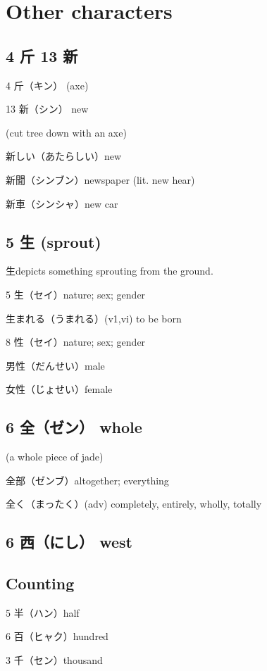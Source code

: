 \chapter{Other characters}

\section{4 斤 13 新}

4 斤（キン） (axe)

13 新（シン） new

(cut tree down with an axe)

新しい（あたらしい）new

新聞（シンブン）newspaper (lit. new hear)

新車（シンシャ）new car

\section{5 生 (sprout)}

生depicts something sprouting from the ground.

5 生（セイ）nature; sex; gender

生まれる（うまれる）(v1,vi) to be born

8 性（セイ）nature; sex; gender

男性（だんせい）male

女性（じょせい）female

\section{6 全（ゼン） whole}

(a whole piece of jade)

全部（ゼンブ）altogether; everything

全く（まったく）(adv) completely, entirely, wholly, totally

\section{6 西（にし） west}

\section{Counting}

5 半（ハン）half

6 百（ヒャク）hundred

3 千（セン）thousand


